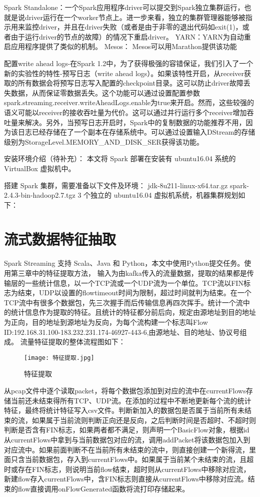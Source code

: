   Spark Standalone：一个Spark应用程序driver可以提交到Spark独立集群运行，也就是说driver运行在一个worker节点上。进一步来看，独立的集群管理器能够被指示用来监控driver，并且在driver失败（或者是由于非零的退出代码如exit(1)，或者由于运行driver的节点的故障）的情况下重启driver。
  YARN：YARN为自动重启应用程序提供了类似的机制。
  Mesos： Mesos可以用Marathon提供该功能
  
  配置write ahead logs-在Spark 1.2中，为了获得极强的容错保证，我们引入了一个新的实验性的特性-预写日志（write ahead logs）。如果该特性开启，从receiver获取的所有数据会将预写日志写入配置的checkpoint目录。这可以防止driver故障丢失数据，从而保证零数据丢失。这个功能可以通过设置配置参数spark.streaming.receiver.writeAheadLogs.enable为true来开启。然而，这些较强的语义可能以receiver的接收吞吐量为代价。这可以通过并行运行多个receiver增加吞吐量来解决。另外，当预写日志开启时，Spark中的复制数据的功能推荐不用，因为该日志已经存储在了一个副本在存储系统中。可以通过设置输入DStream的存储级别为StorageLevel.MEMORY\_AND\_DISK\_SER获得该功能。

安装环境介绍（待补充）：
本文将 Spark 部署在安装有 ubuntu16.04 系统的 VirtualBox 虚拟机中。

搭建 Spark 集群，需要准备以下文件及环境：
jdk-8u211-linux-x64.tar.gz
spark-2.4.3-bin-hadoop2.7.tgz
3 个独立的 ubuntu16.04 虚拟机系统，机器集群规划如下：

\section{流式数据特征抽取}
Spark Streaming 支持 Scala、Java 和 Python，本文中使用Python提交任务。使用第三章中的特征提取方法，
输入为由kafka传入的流量数据，提取的结果都是传输层的一些统计信息，以一个TCP流或一个UDP流为一个单位。TCP流以FIN标志为结束，UDP以设置的flowtimeout时间为限制，超过时间就判为结束。在一个TCP流中有很多个数据包，先三次握手而后传输信息再四次挥手。统计一个流中的统计信息作为提取的特征。且统计的特征都分前后向，规定由源地址到目的地址为正向，目的地址到源地址为反向，为每个流构建一个标志叫Flow ID:192.168.31.100-183.232.231.174-46927-443-6,由源地址、目的地址、协议号组成。
流量特征提取的整体流程图如下：

\begin{figure}
    \centering
    \texttt{[image: 特征提取.jpg]}
    \caption{特征提取}
    \label{fig:特征提取}
  \end{figure}

从pcap文件中逐个读取packet，将每个数据包添加到对应的流中在currentFlows存储当前还未结束得所有TCP、UDP流。在添加的过程中不断地更新每个流的统计特征，最终将统计特征写入csv文件。判断新加入的数据包是否属于当前所有未结束的流，如果属于当前流则判断正向还是反向，之后判断时间是否超时、不超时则判断是否含有FIN标志，如果两者都不满足，则声明一个BasicFlow对象，根据id从currentFlows中拿到与当前数据包对应的流，调用addPacket将该数据包加入到对应流中。如果前面判断不在当前所有未结束的流中，则直接创建一个新得流，里面只含当前数据包，存入到currentFlows中。如果属于当前某个未结束的流，且超时或存在FIN标志，则说明当前flow结束，超时则从currentFlows中移除对应流，新建flow存入currentFlows中，含FIN标志则直接从currentFlows中移除对应流。结束的flow直接调用onFlowGenerated函数将流打印存储起来。

